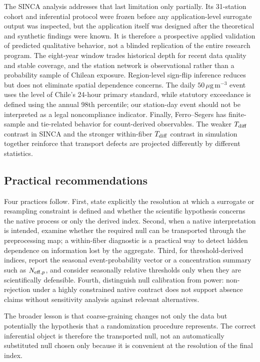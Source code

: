 The SINCA analysis addresses that last limitation only partially. Its 31-station cohort and inferential protocol were frozen before any application-level surrogate output was inspected, but the application itself was designed after the theoretical and synthetic findings were known. It is therefore a prospective applied validation of predicted qualitative behavior, not a blinded replication of the entire research program. The eight-year window trades historical depth for recent data quality and stable coverage, and the station network is observational rather than a probability sample of Chilean exposure. Region-level sign-flip inference reduces but does not eliminate spatial dependence concerns. The daily $50\,\mu\mathrm{g\,m^{-3}}$ event uses the level of Chile's 24-hour primary standard, while statutory exceedance is defined using the annual 98th percentile; our station-day event should not be interpreted as a legal noncompliance indicator. Finally, Ferro--Segers has finite-sample and tie-related behavior for count-derived observables. The weaker $T_{\rm diff}$ contrast in SINCA and the stronger within-fiber $T_{\rm diff}$ contrast in simulation together reinforce that transport defects are projected differently by different statistics.

\subsection{Practical recommendations}\label{sec:recommendations}

Four practices follow. First, state explicitly the resolution at which a surrogate or resampling constraint is defined and whether the scientific hypothesis concerns the native process or only the derived index. Second, when a native interpretation is intended, examine whether the required null can be transported through the preprocessing map; a within-fiber diagnostic is a practical way to detect hidden dependence on information lost by the aggregate. Third, for threshold-derived indices, report the seasonal event-probability vector or a concentration summary such as $N_{\mathrm{eff},p}$, and consider seasonally relative thresholds only when they are scientifically defensible. Fourth, distinguish null calibration from power: non-rejection under a highly constrained native contract does not support absence claims without sensitivity analysis against relevant alternatives.

The broader lesson is that coarse-graining changes not only the data but potentially the hypothesis that a randomization procedure represents. The correct inferential object is therefore the transported null, not an automatically substituted null chosen only because it is convenient at the resolution of the final index.

